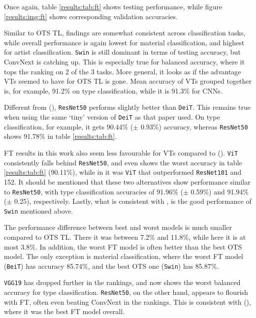 Once again, table \ref{results:tab:ft} shows testing performance, while figure \ref{results:img:ft} shows corresponding validation accuracies.

Similar to OTS TL, findings are somewhat consistent across classification tasks, while overall performance is again lowest for material classification, and highest for artist classification. \texttt{Swin} is still dominant in terms of testing accuracy, but Conv\-Next is catching up. This is especially true for balanced accuracy, where it tops the ranking on 2 of the 3 tasks. More general, it looks as if the advantage VTs seemed to have for OTS TL is gone. Mean accuracy of VTs grouped together is, for example, 91.2\% on type classification, while it is 91.3\% for CNNs.

Different from \citeauthor{matsoukas2021time} (\citeyear{matsoukas2021time}), \texttt{ResNet50} performs slightly better than \texttt{DeiT}. This remains true when using the same `tiny' version of \texttt{DeiT} as that paper used. On type classification, for example, it gets 90.44\% ($\pm$ 0.93\%) accuracy, whereas \texttt{ResNet50} shows 91.78\% in table \ref{results:tab:ft}.

FT results in this work also seem less favourable for VTs compared to \citeauthor{zhou2021convnets} (\citeyear{zhou2021convnets}). \texttt{ViT} consistently falls behind \texttt{ResNet50}, and even shows the worst accuracy in table \ref{results:tab:ft} (90.11\%), while in \citeauthor{zhou2021convnets} it was \texttt{ViT} that outperformed \texttt{ResNet101} and 152. It should be mentioned that these two alternatives show performance similar to \texttt{ResNet50}, with type classification accuracies of 91.96\% ($\pm$ 0.59\%) and 91.94\% ($\pm$ 0.25), respectively. Lastly, what is consistent with \citeauthor{zhou2021convnets}, is the good performance of \texttt{Swin} mentioned above.

The performance difference between best and worst models is much smaller compared to OTS TL. There it was between 7.2\% and 11.8\%, while here it is at most 3.8\%. In addition, the worst FT model is often better than the best OTS model. The only exception is material classification, where the worst FT model (\texttt{BeiT}) has accuracy 85.74\%, and the best OTS one (\texttt{Swin}) has 85.87\%.

\texttt{VGG19} has dropped further in the rankings, and now shows the worst balanced accuracy for type classification. \texttt{ResNet50}, on the other hand, appears to flourish with FT, often even beating Conv\-Next in the rankings. This is consistent with \citeauthor{sabatelli2018deep} (\citeyear{sabatelli2018deep}), where it was the best FT model overall.

